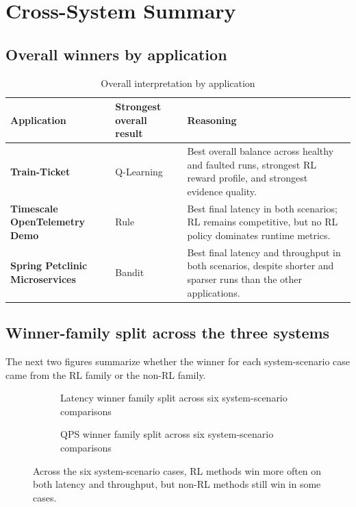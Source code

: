 \documentclass[11pt]{report}
\begin{document}
\chapter{Cross-System Summary}
\section{Overall winners by application}
\begin{table}[H]
\centering
\caption{Overall interpretation by application}
\begin{tabularx}{\textwidth}{>{\bfseries}l l X}
\toprule
Application & Strongest overall result & Reasoning \\
\midrule
Train-Ticket & Q-Learning & Best overall balance across healthy and faulted runs, strongest RL reward profile, and strongest evidence quality. \\
Timescale OpenTelemetry Demo & Rule & Best final latency in both scenarios; RL remains competitive, but no RL policy dominates runtime metrics. \\
Spring Petclinic Microservices & Bandit & Best final latency and throughput in both scenarios, despite shorter and sparser runs than the other applications. \\
\bottomrule
\end{tabularx}
\end{table}

\section{Winner-family split across the three systems}
The next two figures summarize whether the winner for each system-scenario case came from the RL family or the non-RL family.

\begin{figure}[H]
\centering
\begin{subfigure}[t]{0.46\textwidth}
\centering
{}
\caption{Latency winner family split across six system-scenario comparisons}
\end{subfigure}
\hfill
\begin{subfigure}[t]{0.46\textwidth}
\centering
{}
\caption{QPS winner family split across six system-scenario comparisons}
\end{subfigure}
\caption{Across the six system-scenario cases, RL methods win more often on both latency and throughput, but non-RL methods still win in some cases.}
\end{figure}
\end{document}

